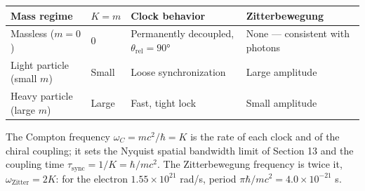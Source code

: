 \documentclass[
]{article}
\newcounter{none} %
\begin{document}
{\def\LTcaptype{none} %
\begin{longtable}[]{@{}
  >{\raggedright\arraybackslash}p{}
  >{\raggedright\arraybackslash}p{}
  >{\raggedright\arraybackslash}p{}
  >{\raggedright\arraybackslash}p{}@{}}
\toprule\noalign{}
\begin{minipage}[b]{\linewidth}\raggedright
Mass regime
\end{minipage} & \begin{minipage}[b]{\linewidth}\raggedright
\(K = m\)
\end{minipage} & \begin{minipage}[b]{\linewidth}\raggedright
Clock behavior
\end{minipage} & \begin{minipage}[b]{\linewidth}\raggedright
Zitterbewegung
\end{minipage} \\
\midrule\noalign{}
\endhead
\bottomrule\noalign{}
\endlastfoot
Massless (\(m = 0\)) & \(0\) & Permanently decoupled,
\(\theta_{\text{rel}} = 90°\) & None --- consistent with photons \\
Light particle (small \(m\)) & Small & Loose synchronization & Large
amplitude \\
Heavy particle (large \(m\)) & Large & Fast, tight lock & Small
amplitude \\
\end{longtable}
}

The Compton frequency \(\omega_C = mc^2/\hbar = K\) is the rate of each
clock and of the chiral coupling; it sets the Nyquist spatial bandwidth
limit of Section 13 and the coupling time
\(\tau_{\text{sync}} = 1/K = \hbar/mc^2\). The Zitterbewegung frequency
is twice it, \(\omega_{\text{Zitter}} = 2K\): for the electron
\(1.55 \times 10^{21}\) rad/s, period
\(\pi\hbar/mc^2 = 4.0 \times 10^{-21}\) s.
\end{document}
